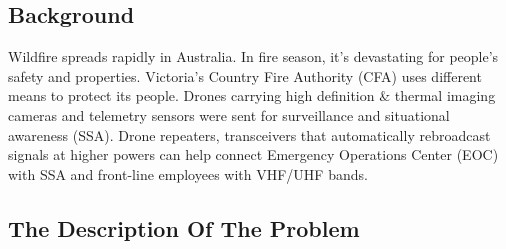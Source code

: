 \documentclass[../main]{subfiles}
\begin{document}
\subsection{Background}

Wildfire spreads rapidly in Australia. In fire season, it's devastating for people's safety and properties. Victoria’s Country Fire Authority (CFA) uses different means to protect its people. Drones carrying high definition & thermal imaging cameras and telemetry sensors were sent for surveillance and situational awareness (SSA). Drone repeaters, transceivers that automatically rebroadcast signals at higher powers can help connect Emergency Operations Center (EOC) with SSA and front-line employees with VHF/UHF bands.

    
\subsection{The Description Of The Problem}
\end{document}
